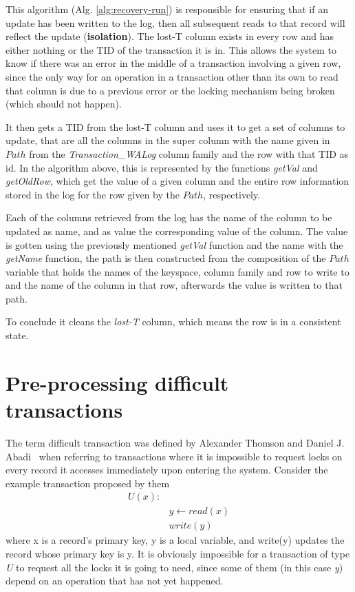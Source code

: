 This algorithm (Alg. \ref{alg:recovery-run}) is responsible for ensuring that if an update has been written to the log, then all subsequent reads to that record will reflect the update (\textbf{isolation}). The lost-T column exists in every row and has either nothing or the TID of the transaction it is in. This allows the system to know if there was an error in the middle of a transaction involving a given row, since the only way for an operation in a transaction other than its own to read that column is due to a previous error or the locking mechanism being broken (which should not happen). 

It then gets a TID from the lost-T column and uses it to get a set of columns to update, that are all the columns in the super column with the name given in $Path$ from the \emph{Transaction\_WALog} column family and the row with that TID as id. In the algorithm above, this is represented by the functions \emph{getVal} and \emph{getOldRow}, which get the value of a given column and the entire row information stored in the log for the row given by the $Path$, respectively.

Each of the columns retrieved from the log has the name of the column to be updated as name, and as value the corresponding value of the column. The value is gotten using the previously mentioned \emph{getVal} function and the name with the \emph{getName} function, the path is then constructed from the composition of the $Path$ variable that holds the names of the keyspace, column family and row to write to and the name of the column in that row, afterwards the value is written to that path.

To conclude it cleans the \emph{lost-T} column, which means the row is in a consistent state.

\section{Pre-processing difficult transactions}
The term difficult transaction was defined by Alexander Thomson and Daniel J. Abadi~\cite{Thomson:2010:CDD:1920841.1920855} when referring to transactions where it is impossible to request locks on every record it accesses immediately upon entering the system. Consider the example transaction proposed by them
\begin{align*}
U(x):& \\
&y \gets read(x)\\
&write(y)
\end{align*}
where x is a record’s primary key, y is a local variable, and write(y) updates the record whose primary key is y. It is obviously impossible for a transaction of type \emph{U} to request all the locks it is going to need, since some of them (in this case \emph{y}) depend on an operation that has not yet happened. 

